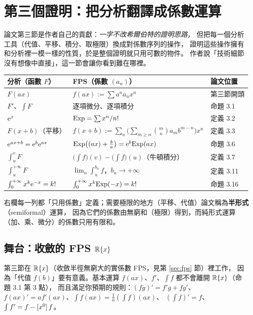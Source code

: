 \section{第三個證明：把分析翻譯成係數運算}\label{sec:klazar}

論文第三節是作者自己的貢獻：\emph{一字不改希爾伯特的證明思路}，
但把每一個分析工具（代值、平移、積分、取極限）換成對係數序列的操作，
證明這些操作擁有和分析裡一模一樣的性質，於是整個證明就只用可數的物件。
作者說「技術細節沒有想像中直接」，這一節會讓你看到難在哪裡。

\begin{keyidea}[翻譯字典]
\begin{center}
\begin{tabular}{@{}lll@{}}
\toprule
分析（函數 $F$） & FPS（係數 $(a_n)$） & 論文位置 \\
\midrule
$F(ax)$ & $f(ax):=\sum a^{n}a_nx^n$ & 第三節開頭 \\
$F'$、$\int F$ & 逐項微分、逐項積分 & 命題 3.1 \\
$\mathrm{e}^{x}$ & $\mathrm{Exp}=\sum x^n/n!$ & 定義 3.2 \\
$F(x+b)$（平移） & $f(x+b):=\sum_n\big(\sum_{m\ge n}\binom mn a_mb^{m-n}\big)x^n$ & 定義 3.3 \\
$\mathrm{e}^{ax+b}=\mathrm{e}^{b}\mathrm{e}^{ax}$ & $\mathrm{Exp}\big((ax)+\tfrac ba\big)=\mathrm{e}^{b}\mathrm{Exp}(ax)$ & 命題 3.6 \\
$\int_u^vF$ & $\big(\int f\big)(v)-\big(\int f\big)(u)$（牛頓積分） & 定義 3.7 \\
$\int_u^{+\infty}F$ & $\lim_n\int_u^{b_n}f$，$b_n\to+\infty$ & 定義 3.11 \\
$\int_0^{+\infty}x^k\mathrm{e}^{-x}=k!$ & $\int_0^{+\infty}x^k\mathrm{Exp}(-x)=k!$ & 命題 3.16 \\
\bottomrule
\end{tabular}
\end{center}
右欄每一列都「只用係數」定義；需要極限的地方（平移、代值）論文稱為\textbf{半形式}（semiformal）運算，
因為它們的係數由無窮和（極限）得到，而純形式運算（加、乘、微分）的係數只用有限和。
\end{keyidea}

\subsection{舞台：收斂的 FPS $\mathbb{R}\{x\}$}

第三節在 $\mathbb{R}\{x\}$（收斂半徑無窮大的實係數 FPS，見第 \ref{sec:fps} 節）裡工作，
因為「代值 $f(b)$」要有意義。基本運算 $f(ax)$、$f'$、$\int f$ 都不會離開 $\mathbb{R}\{x\}$（命題 3.1 第 3 點），
而且滿足你預期的規則：$(fg)'=f'g+fg'$、$f(ax)'=af'(ax)$、$\int f(ax)=\frac1a(\int f)(ax)$、
$(\int f)'=f$、$\int f'=f-[x^{0}]\,f$。

